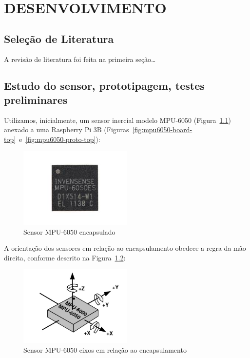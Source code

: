\chapter{DESENVOLVIMENTO}\label{chap:desenvolvimento}

\section{Seleção de Literatura}

A revisão de literatura foi feita na primeira seção\ldots

\section{Estudo do sensor, prototipagem, testes preliminares}

Utilizamos, inicialmente, um sensor inercial modelo MPU-6050 (Figura~\ref{fig:mpu6050-sensor-top}) anexado a uma Raspberry Pi 3B (Figuras~\ref{fig:mpu6050-board-top}~e~\ref{fig:mpu6050-proto-top}):
\begin{figure}[H]
    \centering
    \caption{Sensor MPU-6050 encapsulado}\label{fig:mpu6050-sensor-top}
    \includegraphics[width=0.5\textwidth]{figuras/mpu6050-sensor-top-straight.jpg}
\end{figure}
A orientação dos sensores em relação ao encapsulamento obedece a regra da mão direita, conforme descrito na Figura~\ref{fig:mpu6050-diagram-axis}:
\begin{figure}[H]
    \centering
    \caption{Sensor MPU-6050 eixos em relação ao encapsulamento}\label{fig:mpu6050-diagram-axis}
    \includegraphics[width=0.5\textwidth]{figuras/mpu6050-diagram-axis.jpg}
\end{figure}
